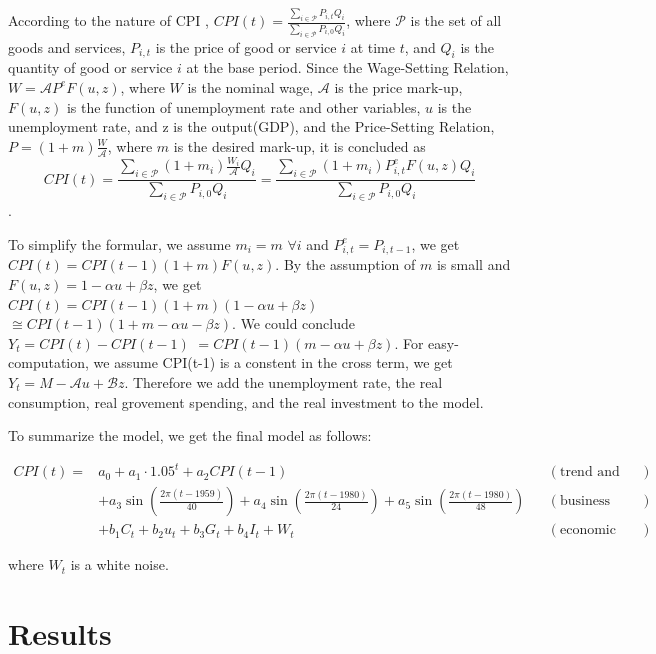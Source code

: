 \documentclass[
  man,floatsintext,
  man]{apa6}
\begin{document}
According to the nature of CPI \autocite{blanchard2004macroeconomics}, \(CPI(t) = \frac{\sum_{i \in \mathcal{P}} P_{i,t} Q_i}{\sum_{i \in \mathcal{P}} P_{i,0} Q_i}\), where \(\mathcal{P}\) is the set of all goods and services, \(P_{i,t}\) is the price of good or service \(i\) at time \(t\), and \(Q_i\) is the quantity of good or service \(i\) at the base period.
Since the Wage-Setting Relation, \(W = \mathcal{A} P^e F(u,z)\), where \(W\) is the nominal wage, \(\mathcal{A}\) is the price mark-up, \(F(u,z)\) is the function of unemployment rate and other variables, \(u\) is the unemployment rate, and z is the output(GDP), and the Price-Setting Relation, \(P = (1+m)\frac{W}{\mathcal{A}}\), where \(m\) is the desired mark-up,
it is concluded as
\[CPI(t) = \frac{\sum_{i \in \mathcal{P}} (1+m_i) \frac{W_i}{\mathcal{A}} Q_i}{\sum_{i \in \mathcal{P}} P_{i,0} Q_i} = \frac{\sum_{i \in \mathcal{P}} (1+m_i) P_{i,t}^e F(u,z) Q_i}{\sum_{i \in \mathcal{P}} P_{i,0} Q_i}\].

To simplify the formular, we assume \(m_i = m \,\, \forall i\) and \(P_{i,t}^e = P_{i,t-1}\), we get \(CPI(t) = CPI(t-1) (1+m) F(u,z)\).
By the assumption of \(m\) is small and \(F(u,z) = 1 - \alpha u + \beta z\), we get \(CPI(t) = CPI(t-1) (1+m) (1 - \alpha u + \beta z)\) \(\cong CPI(t-1) ( 1 + m - \alpha u - \beta z)\).
We could conclude \(Y_t = CPI(t) - CPI(t-1)\) \(=CPI(t-1)( m - \alpha u + \beta z)\).
For easy-computation, we assume CPI(t-1) is a constent in the cross term, we get \(Y_t = M - \mathcal{A} u + \mathcal{B} z\).
Therefore we add the unemployment rate, the real consumption, real grovement spending, and the real investment to the model.

To summarize the model, we get the final model as follows:

\begin{align*}
CPI(t) =& a_0 + a_1 \cdot 1.05^t + a_2 CPI(t-1)  && (\text{trend and lags})\\
& + a_3 \sin\left(\frac{2\pi(t-1959)}{40}\right) + a_4 \sin\left(\frac{2\pi(t-1980)}{24}\right) + a_5 \sin\left(\frac{2\pi(t-1980)}{48}\right) && (\text{business cycle})\\
& + b_1 C_t + b_2 u_t + b_3 G_t + b_4 I_t + W_t && (\text{economic variables})
\end{align*}

where \(W_t\) is a white noise.

\section{Results}\label{results}
\end{document}
